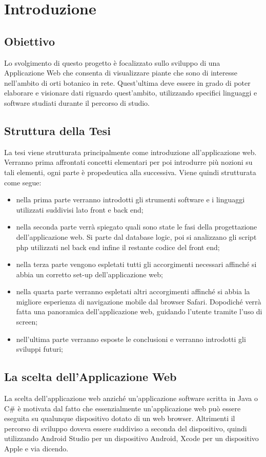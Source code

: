 \chapter{Introduzione}

\section{Obiettivo}
Lo svolgimento di questo progetto è focalizzato sullo sviluppo di una Applicazione Web che consenta di visualizzare piante che sono di interesse nell'ambito di orti botanico in rete.
Quest'ultima deve essere in grado di poter elaborare e visionare dati riguardo quest'ambito, utilizzando specifici linguaggi e software studiati durante il percorso di studio. \newline

\section{Struttura della Tesi}
La tesi viene strutturata principalmente come introduzione all'applicazione web.
Verranno prima affrontati concetti elementari per poi introdurre più nozioni su tali elementi, ogni parte è propedeutica alla successiva.
Viene quindi strutturata come segue:
\begin{itemize}
\item nella prima parte verranno introdotti gli strumenti software e i linguaggi utilizzati suddivisi lato front e back end;
\item nella seconda parte verrà spiegato quali sono state le fasi della progettazione dell'applicazione web. Si parte dal database logic, poi si analizzano gli script php utilizzati nel back end infine il restante codice del front end;
\item nella terza parte  vengono espletati tutti gli accorgimenti necessari affinché si abbia un corretto set-up dell'applicazione web; 
\item nella quarta parte verranno espletati altri accorgimenti affinché si abbia la migliore esperienza di navigazione mobile dal browser Safari. Dopodiché verrà fatta una panoramica dell'applicazione web, guidando l'utente tramite l'uso di screen;
\item nell'ultima parte verranno esposte le conclusioni e verranno introdotti gli sviluppi futuri;
\end{itemize}
\section{La scelta dell'Applicazione Web}
La scelta dell'applicazione web anziché un'applicazione software scritta in Java o C\# è motivata dal fatto che essenzialmente un'applicazione web può essere eseguita su qualunque dispositivo dotato di un web browser. Altrimenti il percorso di sviluppo doveva essere suddiviso a seconda del dispositivo, quindi utilizzando Android Studio per un dispositivo Android, Xcode per un dispositivo Apple e via dicendo. \newline

